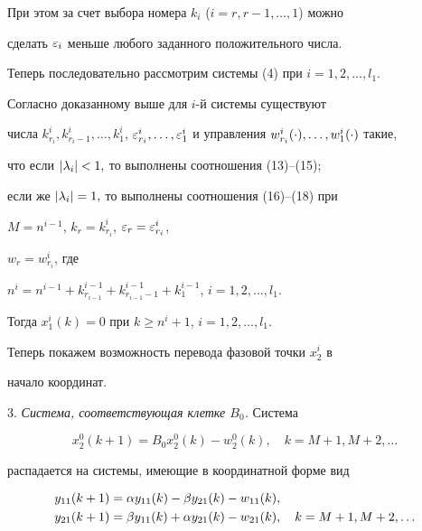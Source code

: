 При этом за счет выбора номера $k_i$ ($i= r,r-1, \dotsc, 1$) можно


сделать $\varepsilon_i$ меньше любого заданного положительного числа.





Теперь последовательно рассмотрим системы (4) при $i=1,2,\dotsc,l_1$.


Согласно доказанному выше для $i$-й системы существуют


числа $k^i_{r_i}, k^i_{r_i-1}, \dotsc, k^i_1$, $\ve^i_{r_i}, \dotsc,


\ve^i_1$ и управления $w^i_{r_i}(\cc),\dotsc, w^i_1(\cc)$ такие,


что если $|{\lambda}_i|<1, $ то выполнены соотношения (13)--(15);


если же $|{\lambda}_i| = 1, $ то выполнены соотношения (16)--(18) при


$M = n^{i-1}$, $k_r = k^i_{r_i}$, $\varepsilon_r = \varepsilon^i_{r_i}$,


$w_r = w^i_{r_i}$, где


$n^i = n^{i-1} +


k^{i-1}_{r_{i-1}}+k^{i-1}_{r_{i-1}-1}+k^{i-1}_1$, $i=1,2,\dotsc,l_1$.


Тогда $x_1^i(k) = 0$ при $k \geq n^i+1$, $i = 1,2,\dotsc,l_1$.





Теперь покажем возможность перевода фазовой точки $x_2^i $ в


начало координат.


\medskip





3. {\it Система, соответствующая клетке $B_0$.} Система


\begin{equation}


x_2^0(k+1) = B_0x_2^0(k) - w_2^0(k),\quad k=M+1, M+2, \dotsc


\end{equation}


распадается на системы, имеющие в координатной форме вид


\begin{equation}


\begin{split}


y_{11}(k+1) &= \a y_{11}(k)- \b y_{21}(k) - w_{11}(k),\\


y_{21}(k+1) &= \b y_{11}(k)+ \a y_{21}(k) - w_{21}(k),


\quad k=M+1, M+2, \dotsc


\end{split}


\end{equation}


